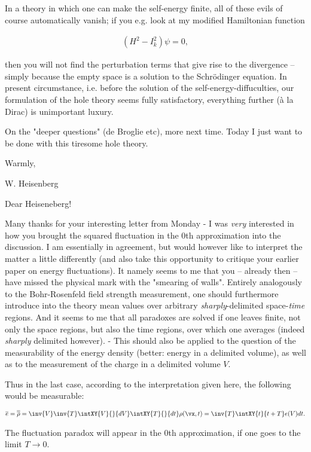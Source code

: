 \documentclass{article}
\newcommand{\nc}[2]{
  \newcommand{#1}{#2}
}
\newcommand{\uequ}[1]{
\begin{align*}
#1
\end{align*}
}
\begin{document}
In a theory in which one can make the self-energy finite, all of these evils of course automatically vanish; if you e.g. look at my modified Hamiltonian function
\uequ{
(H^2 - I_k^2)\psi = 0,
}
then you will not find the perturbation terms that give rise to the divergence -- simply because the empty space is a solution to the Schr\"odinger equation. In present circumstance, i.e. before the solution of the self-energy-diffuculties, our formulation of the hole theory seems fully satisfactory, everything further (\`a la Dirac) is unimportant luxury.

On the "deeper questions" (de Broglie etc), more next time. Today I just want to be done with this tiresome hole theory.

Warmly,

W. Heisenberg

\date{February 13, 1934}

Dear Heiseneberg!

Many thanks for your interesting letter from Monday - I was \textit{very} interested in how you brought the squared fluctuation in the 0th approximation into the discussion. I am essentially in agreement, but would however like to interpret the matter a little differently (and also take this opportunity to critique your earlier paper on energy fluctuations). It namely seems to me that you -- already then -- have missed the physical mark with the "smearing of walls". Entirely analogously to the Bohr-Rosenfeld field strength measurement, one should furthermore introduce into the theory mean values over arbitrary \textit{sharply}-delimited space-\textit{time} regions. And it seems to me that all paradoxes are solved if one leaves finite, not only the space regions, but also the time regions, over which one averages (indeed \textit{sharply} delimited however). - This should also be applied to the question of the measurability of the energy density (better: energy in a delimited volume), as well as to the measurement of the charge in a delimited volume $V$.

\nc{\ebar}{\overline{e}}
\nc{\rhobar}{\overline{\rho}}
\nc{\rhobbar}{\overline{\rhobar}}

Thus in the last case, according to the interpretation given here, the following would be measurable:
\uequ{
\ebar = \rhobbar = \inv{V}\inv{T}\intXY{V}{}{dV}\intXY{T}{}{dt}\rho(\vx,t) =
\inv{T}\intXY{t}{t+T}e(V){dt}.
}
The fluctuation paradox will appear in the 0th approximation, if one goes to the limit $T \to 0$.
\end{document}
